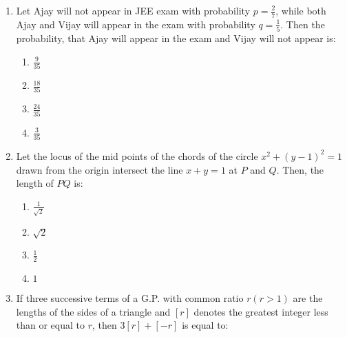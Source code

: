 \documentclass[journal]{IEEEtran}
\newcommand{\brak}[1]{\left( #1 \right)}
\newcommand{\sbrak}[1]{\left[ #1 \right]}
\begin{document}
\begin{enumerate}
        \begin{multicols}{4}
        \begin{enumerate}
        \item $2$
        \item $\frac{3}{2}$
        \item $\frac{5}{2}$
        \item $1$
        \end{enumerate}
        \end{multicols}

    \item Let Ajay will not appear in JEE exam with probability $p=\frac{2}{7}$, while both Ajay and Vijay will appear in the exam with probability $q=\frac{1}{5}$. Then the probability, that Ajay will appear in the exam and Vijay will not appear is:

        \begin{multicols}{4}
        \begin{enumerate}
        \item $\frac{9}{35}$
        \item $\frac{18}{35}$
        \item $\frac{24}{35}$
        \item $\frac{3}{35}$
        \end{enumerate}
        \end{multicols}
        
    \item Let the locus of the mid points of the chords of the circle $x^{2}+\brak{y-1}^{2}=1$ drawn from the origin intersect the line $x+y=1$ at $P$ and $Q$. Then, the length of $PQ$ is:

        \begin{multicols}{4}
        \begin{enumerate}
        \item $\frac{1}{\sqrt{2}}$
        \item $\sqrt{2}$
        \item $\frac{1}{2}$
        \item $1$
        \end{enumerate}
        \end{multicols}
        
    \item If three successive terms of a G.P. with common ratio $r\brak{r>1}$ are the lengths of the sides of a triangle and $\sbrak{r}$ denotes the greatest integer less than or equal to $r$, then $3\sbrak{r}+\sbrak{-r}$ is equal to:


\end{enumerate}
\end{document}
